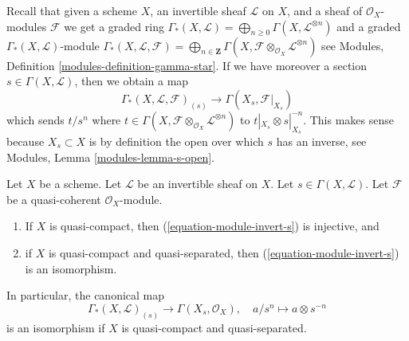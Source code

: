 \noindent
Recall that given a scheme $X$, an invertible sheaf $\mathcal{L}$
on $X$, and a sheaf of $\mathcal{O}_X$-modules $\mathcal{F}$
we get a graded ring
$\Gamma_*(X, \mathcal{L}) =
\bigoplus\nolimits_{n \geq 0} \Gamma(X, \mathcal{L}^{\otimes n})$
and a graded $\Gamma_*(X, \mathcal{L})$-module
$\Gamma_*(X, \mathcal{L}, \mathcal{F}) =
\bigoplus\nolimits_{n \in \mathbf{Z}}
\Gamma(X, \mathcal{F} \otimes_{\mathcal{O}_X} \mathcal{L}^{\otimes n})$
see Modules, Definition \ref{modules-definition-gamma-star}.
If we have moreover a section $s \in \Gamma(X, \mathcal{L})$, then
we obtain a map
\begin{equation}
\label{equation-module-invert-s}
\Gamma_*(X, \mathcal{L}, \mathcal{F})_{(s)}
\longrightarrow
\Gamma(X_s, \mathcal{F}|_{X_s})
\end{equation}
which sends $t/s^n$ where
$t \in \Gamma(X, \mathcal{F} \otimes_{\mathcal{O}_X} \mathcal{L}^{\otimes n})$
to $t|_{X_s} \otimes s|_{X_s}^{-n}$. This makes sense
because $X_s \subset X$ is by definition the open over which
$s$ has an inverse, see Modules, Lemma \ref{modules-lemma-s-open}.

\begin{lemma}
\label{lemma-invert-s-sections}
\begin{reference}
\cite[Section 6.8]{EGA1-second}
\end{reference}
Let $X$ be a scheme. Let $\mathcal{L}$ be an invertible sheaf on $X$.
Let $s \in \Gamma(X, \mathcal{L})$. Let $\mathcal{F}$ be a quasi-coherent
$\mathcal{O}_X$-module.
\begin{enumerate}
\item If $X$ is quasi-compact, then (\ref{equation-module-invert-s})
is injective, and
\item if $X$ is quasi-compact and quasi-separated, then
(\ref{equation-module-invert-s}) is an isomorphism.
\end{enumerate}
In particular, the canonical map
$$
\Gamma_*(X, \mathcal{L})_{(s)}
\longrightarrow
\Gamma(X_s, \mathcal{O}_X),\quad
a/s^n \longmapsto a \otimes s^{-n}
$$
is an isomorphism if $X$ is quasi-compact and quasi-separated.
\end{lemma}

